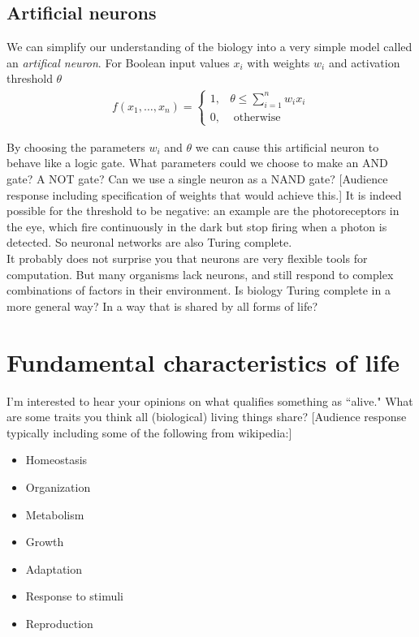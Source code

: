 \documentclass{article}
\begin{document}
\subsection*{Artificial neurons}

We can simplify our understanding of the biology into a very simple model called an \textit{artifical neuron}. For Boolean input values $x_i$ with weights $w_i$ and activation threshold $\theta$
\begin{eqnarray*}
 f \left(x_1, \ldots, x_n\right) = \left\{
     \begin{array}{ll}
       1, &  \theta \leq \sum_{i=1}^n w_i x_i \\
       0, & \textrm{ otherwise}
     \end{array}
   \right.
\end{eqnarray*}

By choosing the parameters $w_i$ and $\theta$ we can cause this artificial neuron to behave like a logic gate. What parameters could we choose to make an AND gate? A NOT gate? Can we use a single neuron as a NAND gate? [Audience response including specification of weights that would achieve this.] It is indeed possible for the threshold to be negative: an example are the photoreceptors in the eye, which fire continuously in the dark but stop firing when a photon is detected. So neuronal networks are also Turing complete.\\

It probably does not surprise you that neurons are very flexible tools for computation. But
many organisms lack neurons, and still respond to complex combinations of factors in their environment. Is biology Turing complete in a more general way? In a way that is shared by all forms of life?

\section*{Fundamental characteristics of life}

I'm interested to hear your opinions on what qualifies something as ``alive." What are some traits you think all (biological) living things share? [Audience response typically including some of the following from wikipedia:]

\begin{itemize}[itemsep=0pt]
\item Homeostasis
\item Organization
\item Metabolism
\item Growth
\item Adaptation
\item Response to stimuli
\item Reproduction
\end{itemize}
\end{document}
